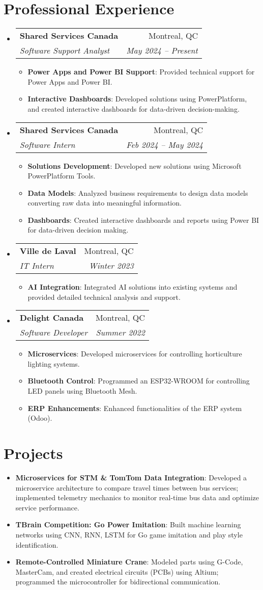 \documentclass[letterpaper,11pt]{article}
\makeatletter
\newcommand{\resumeItem}[2]{
  \item\small{
    \textbf{#1}{: #2 \vspace{-2pt}}
  }
}
\newcommand{\resumeSubheading}[4]{
  \vspace{-1pt}\item
    \begin{tabular*}{0.97\textwidth}{l@{\extracolsep{\fill}}r}
      \textbf{#1} & #2 \\
      \textit{\small#3} & \textit{\small #4} \\
    \end{tabular*}\vspace{-5pt}
}
\newcommand{\resumeSubItem}[2]{\resumeItem{#1}{#2}\vspace{-4pt}}
\newcommand{\resumeSubHeadingListStart}{\begin{itemize}[leftmargin=*]}
\newcommand{\resumeSubHeadingListEnd}{\end{itemize}}
\newcommand{\resumeItemListStart}{\begin{itemize}}
\newcommand{\resumeItemListEnd}{\end{itemize}\vspace{-5pt}}
\makeatother
\begin{document}
\section{Professional Experience}
  \resumeSubHeadingListStart

    \resumeSubheading
      {Shared Services Canada}{Montreal, QC}
      {Software Support Analyst}{May 2024 -- Present}
      \resumeItemListStart
        \resumeItem{Power Apps and Power BI Support}
          {Provided technical support for Power Apps and Power BI.}
        \resumeItem{Interactive Dashboards}
          {Developed solutions using PowerPlatform, and created interactive dashboards for data-driven decision-making.}
      \resumeItemListEnd

    \resumeSubheading
      {Shared Services Canada}{Montreal, QC}
      {Software Intern}{Feb 2024 -- May 2024}
      \resumeItemListStart
        \resumeItem{Solutions Development}
          {Developed new solutions using Microsoft PowerPlatform Tools.}
        \resumeItem{Data Models}
          {Analyzed business requirements to design data models converting raw data into meaningful information.}
        \resumeItem{Dashboards}
          {Created interactive dashboards and reports using Power BI for data-driven decision making.}
      \resumeItemListEnd

    \resumeSubheading
      {Ville de Laval}{Montreal, QC}
      {IT Intern}{Winter 2023}
      \resumeItemListStart
        \resumeItem{AI Integration}
          {Integrated AI solutions into existing systems and provided detailed technical analysis and support.}
      \resumeItemListEnd

    \resumeSubheading
      {Delight Canada}{Montreal, QC}
      {Software Developer}{Summer 2022}
      \resumeItemListStart
        \resumeItem{Microservices}
          {Developed microservices for controlling horticulture lighting systems.}
        \resumeItem{Bluetooth Control}
          {Programmed an ESP32-WROOM for controlling LED panels using Bluetooth Mesh.}
        \resumeItem{ERP Enhancements}
          {Enhanced functionalities of the ERP system (Odoo).}
      \resumeItemListEnd

  \resumeSubHeadingListEnd


\section{Projects}
  \resumeSubHeadingListStart
    \resumeSubItem{Microservices for STM \& TomTom Data Integration}
      {Developed a microservice architecture to compare travel times between bus services; implemented telemetry mechanics to monitor real-time bus data and optimize service performance.}
    \resumeSubItem{TBrain Competition: Go Power Imitation}
      {Built machine learning networks using CNN, RNN, LSTM for Go game imitation and play style identification.}
    \resumeSubItem{Remote-Controlled Miniature Crane}
      {Modeled parts using G-Code, MasterCam, and created electrical circuits (PCBs) using Altium; programmed the microcontroller for bidirectional communication.}
  \resumeSubHeadingListEnd
\end{document}
